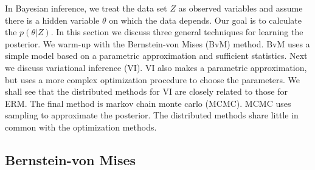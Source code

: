 \documentclass[thesis.tex]{subfiles}
\begin{document}
In Bayesian inference, 
we treat the data set $Z$ as observed variables and assume there is a hidden variable $\theta$ on which the data depends.
Our goal is to calculate the  $p(\theta | Z)$.
In this section we discuss three general techniques for learning the posterior.
We warm-up with the Bernstein-von Mises (BvM) method.
BvM uses a simple model based on a parametric approximation and sufficient statistics.
Next we discuss variational inference (VI).
VI also makes a parametric approximation,
but uses a more complex optimization procedure to choose the parameters.
We shall see that the distributed methods for VI are closely related to those for ERM.
The final method is markov chain monte carlo (MCMC).
MCMC uses sampling to approximate the posterior.
The distributed methods share little in common with the optimization methods.



\subsection{Bernstein-von Mises}
\end{document}
